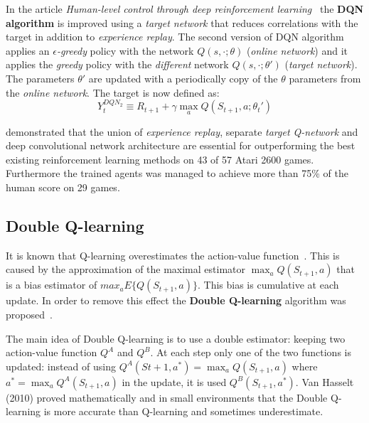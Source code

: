 In the article \textit{Human-level control through deep reinforcement learning}~\cite{Mnih2015} the \textbf{DQN algorithm} is improved using a \textit{target network} that reduces correlations with the target in addition to \textit{experience replay}.
The second version of DQN algorithm applies an \textit{$\epsilon$-greedy} policy with the network $Q(s, \cdotp; \theta)$ (\textit{online network}) and it applies the \textit{greedy} policy with the \emph{different} network $Q(s, \cdotp; \theta')$ (\textit{target network}). The parameters $\theta'$ are updated with a periodically copy of the $\theta$ parameters from the \textit{online network}. The target is now defined as:
\begin{equation}
Y^{DQN_2}_t \equiv R_{t+1} + \gamma \max_{a} Q(S_{t+1}, a; \theta_t')
\end{equation}

\citeauthor{Mnih2015}  demonstrated that the union of \textit{experience replay}, separate \textit{target Q-network} and deep convolutional network architecture are essential for outperforming the best existing reinforcement learning methods on 43 of 57 Atari 2600 games. Furthermore the trained agents was managed to achieve more than 75\% of the human score on 29 games.



\subsection{Double Q-learning}
\label{subsec:DoubleQlearning}

It is known that Q-learning overestimates the action-value function~\cite{NIPS2010_3964}. This is caused by the approximation of the maximal estimator $\max_a Q(S_{t+1}, a)$ that is a bias estimator of $max_a E \{ Q(S_{t+1}, a) \}$. This bias is cumulative at each update. In order to remove this effect the \textbf{Double Q-learning} algorithm was proposed~\cite{NIPS2010_3964}.

The main idea of Double Q-learning is to use a double estimator: keeping two action-value function $Q^A$ and $Q^B$. At each step only one of the two functions is updated: instead of using $Q^A(S{t+1}, a^*) = \max_a Q(S_{t+1}, a)$ where $a^* = \max_a Q^A(S_{t+1}, a)$ in the update, it is used $Q^B(S_{t+1}, a^*)$.
Van Hasselt (2010) proved mathematically and in small environments that the Double Q-learning is more accurate than Q-learning and sometimes underestimate.
\
